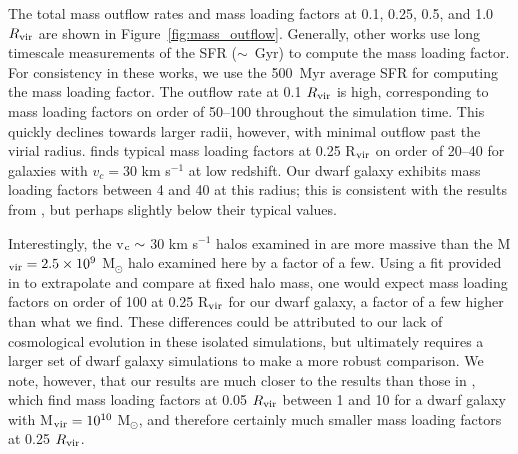 \documentclass[twocolumn]{aastex61}
\begin{document}
The total mass outflow rates and mass loading factors at 0.1, 0.25, 0.5, and 1.0 $R_{\rm vir}$ are shown in Figure~\ref{fig:mass_outflow}. Generally, other works use long timescale measurements of the SFR ($\sim$~Gyr) to compute the mass loading factor. For consistency in these works, we use the 500~Myr average SFR for computing the mass loading factor. The outflow rate at 0.1 $R_{\rm vir}$ is high, corresponding to mass loading factors on order of 50--100 throughout the simulation time. This quickly declines towards larger radii, however, with minimal outflow past the virial radius. \citet{Muratov2015} finds typical mass loading factors at 0.25 R$_{\rm vir}$ on order of 20--40 for galaxies with $v_{c} = 30$ km s$^{-1}$ at low redshift. Our dwarf galaxy exhibits mass loading factors between 4 and 40 at this radius; this is consistent with the results from \citet{Muratov2015}, but perhaps slightly below their typical values. 

Interestingly, the v$_{\rm c}\sim$ 30 km s$^{-1}$ halos examined in \citet{Muratov2015} are more massive than the M$_{\rm vir} = 2.5\times 10^9$ M$_{\odot}$ halo examined here by a factor of a few. Using a fit provided in \citet{Muratov2015} to extrapolate and compare at fixed halo mass, one would expect mass loading factors on order of 100 at 0.25 R$_{\rm vir}$ for our dwarf galaxy, a factor of a few higher than what we find. These differences could be attributed to our lack of cosmological evolution in these isolated simulations, but ultimately requires a larger set of dwarf galaxy simulations to make a more robust comparison. We note, however, that our results are much closer to the \citep{Muratov2015} results than those in \citet{Hu2016,Hu2017}, which find mass loading factors at 0.05 $R_{\rm vir}$ between 1 and 10 for a dwarf galaxy with M$_{\rm vir} = 10^{10}$ M$_{\odot}$, and therefore certainly much smaller mass loading factors at 0.25 $R_{\rm vir}$.
\end{document}
